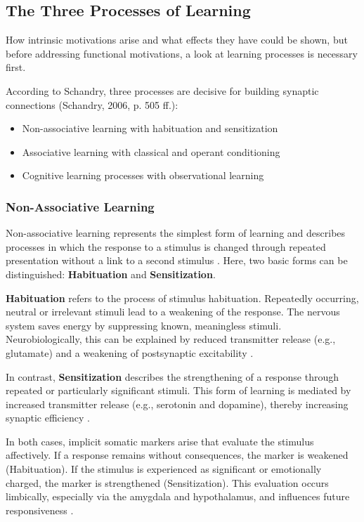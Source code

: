 \subsection*{The Three Processes of Learning}

How intrinsic motivations arise and what effects they have could be shown, but before addressing functional motivations, a look at learning processes is necessary first.

According to Schandry, three processes are decisive for building synaptic connections (Schandry, 2006, p. 505 ff.):

\begin{itemize}
  \item Non-associative learning with habituation and sensitization
  \item Associative learning with classical and operant conditioning
  \item Cognitive learning processes with observational learning
\end{itemize}

\subsubsection*{Non-Associative Learning}

Non-associative learning represents the simplest form of learning and describes processes in which the response to a stimulus is changed through repeated presentation without a link to a second stimulus \cite{Schandry2006}. Here, two basic forms can be distinguished: \textbf{Habituation} and \textbf{Sensitization}.

\textbf{Habituation} refers to the process of stimulus habituation. Repeatedly occurring, neutral or irrelevant stimuli lead to a weakening of the response. The nervous system saves energy by suppressing known, meaningless stimuli. Neurobiologically, this can be explained by reduced transmitter release (e.g., glutamate) and a weakening of postsynaptic excitability \cite{Kandel2001}.

In contrast, \textbf{Sensitization} describes the strengthening of a response through repeated or particularly significant stimuli. This form of learning is mediated by increased transmitter release (e.g., serotonin and dopamine), thereby increasing synaptic efficiency \cite{LeDoux1996, Panksepp1998}.

In both cases, implicit somatic markers arise that evaluate the stimulus affectively. If a response remains without consequences, the marker is weakened (Habituation). If the stimulus is experienced as significant or emotionally charged, the marker is strengthened (Sensitization). This evaluation occurs limbically, especially via the amygdala and hypothalamus, and influences future responsiveness \cite{Damasio1999}.

